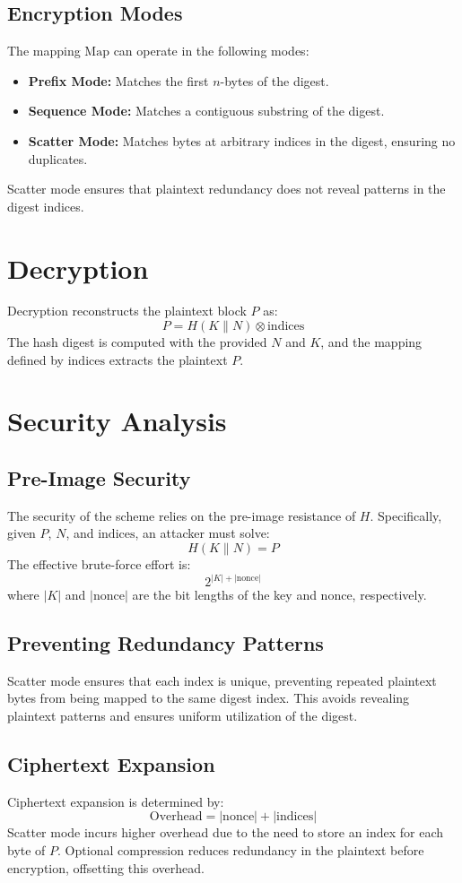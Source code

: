 \documentclass[11pt,a4paper]{article}
\begin{document}
\subsection*{Encryption Modes}
The mapping \( \text{Map} \) can operate in the following modes:
\begin{itemize}
  \item \textbf{Prefix Mode:} Matches the first \( n \)-bytes of the digest.
  \item \textbf{Sequence Mode:} Matches a contiguous substring of the digest.
  \item \textbf{Scatter Mode:} Matches bytes at arbitrary indices in the digest, ensuring no duplicates.
\end{itemize}
Scatter mode ensures that plaintext redundancy does not reveal patterns in the digest indices.

\section*{Decryption}
Decryption reconstructs the plaintext block \( P \) as:
\[
P = H(K \parallel N) \otimes \text{indices}
\]
The hash digest is computed with the provided \( N \) and \( K \), and the mapping defined by \( \text{indices} \) extracts the plaintext \( P \).

\section*{Security Analysis}
\subsection*{Pre-Image Security}
The security of the scheme relies on the pre-image resistance of \( H \). Specifically, given \( P \), \( N \), and \( \text{indices} \), an attacker must solve:
\[
H(K \parallel N) = P
\]
The effective brute-force effort is:
\[
2^{|K| + |\text{nonce}|}
\]
where \( |K| \) and \( |\text{nonce}| \) are the bit lengths of the key and nonce, respectively. 

\subsection*{Preventing Redundancy Patterns}
Scatter mode ensures that each index is unique, preventing repeated plaintext bytes from being mapped to the same digest index. This avoids revealing plaintext patterns and ensures uniform utilization of the digest.

\subsection*{Ciphertext Expansion}
Ciphertext expansion is determined by:
\[
\text{Overhead} = |\text{nonce}| + |\text{indices}|
\]
Scatter mode incurs higher overhead due to the need to store an index for each byte of \( P \). Optional compression reduces redundancy in the plaintext before encryption, offsetting this overhead.
\end{document}
